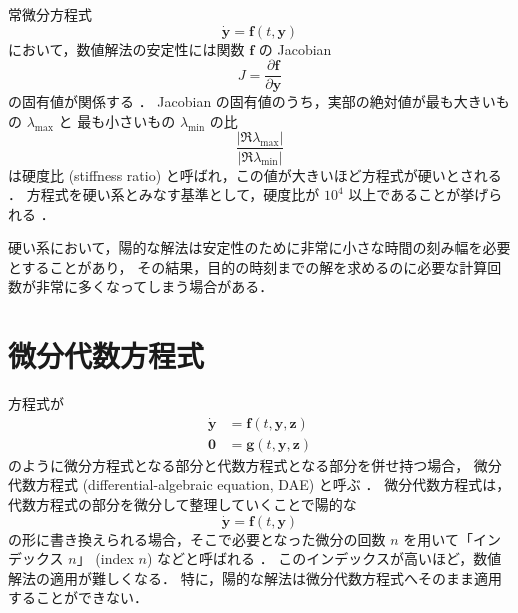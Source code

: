 常微分方程式
\begin{equation}
    \dot{\bm{y}} = \bm{f}(t, \bm{y})
\end{equation}
において，数値解法の安定性には関数 $\bm{f}$ の Jacobian
\begin{equation}
    J = \frac{\partial \bm{f}}{\partial \bm{y}}
\end{equation}
の固有値が関係する \cite{Hairer1991,Mitsui1993}．
Jacobian の固有値のうち，実部の絶対値が最も大きいもの $\lambda_\mathrm{max}$ と
最も小さいもの $\lambda_\mathrm{min}$ の比
\begin{equation}
    \frac{|\Re \lambda_\mathrm{max}|}{|\Re \lambda_\mathrm{min}|}
\end{equation}
は硬度比 (stiffness ratio)
%
%
と呼ばれ，この値が大きいほど方程式が硬いとされる \cite{Mitsui1993}．
方程式を硬い系とみなす基準として，硬度比が $10^4$ 以上であることが挙げられる \cite{Mitsui1993}．

硬い系において，陽的な解法は安定性のために非常に小さな時間の刻み幅を必要とすることがあり，
その結果，目的の時刻までの解を求めるのに必要な計算回数が非常に多くなってしまう場合がある．

\section{微分代数方程式}\label{sec:ode_intro_dae}


方程式が
\begin{align}
    \dot{\bm{y}} & = \bm{f}(t, \bm{y}, \bm{z}) \\
    \bm{0}       & = \bm{g}(t, \bm{y}, \bm{z})
\end{align}
のように微分方程式となる部分と代数方程式となる部分を併せ持つ場合，
微分代数方程式 (differential-algebraic equation, DAE) と呼ぶ \cite{Hairer1991}．
微分代数方程式は，代数方程式の部分を微分して整理していくことで陽的な
\begin{equation}
    \dot{\bm{y}} = \bm{f}(t, \bm{y})
\end{equation}
の形に書き換えられる場合，そこで必要となった微分の回数 $n$ を用いて「インデックス $n$」 (index $n$)
%
%
などと呼ばれる \cite{Hairer1991}．
このインデックスが高いほど，数値解法の適用が難しくなる．
特に，陽的な解法は微分代数方程式へそのまま適用することができない．
